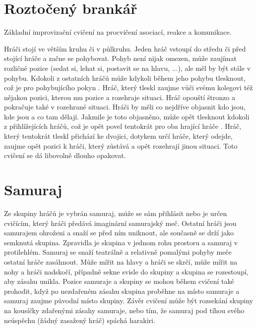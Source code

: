 \documentclass[main.tex]{subfiles}
\begin{document}
 
 
 
\needspace{5cm} \section{Roztočený brankář} \label{roztočený brankář} Základní improvizační cvičení na procvičení asociací, reakce a komunikace. 
 
Hráči stojí ve větším kruhu či v půlkruhu. Jeden hráč vstoupí do středu či před stojící hráče a začne se pohybovat. Pohyb není nijak omezen, může zaujímat rozličné pozice (sedat si, lehat si, postavit se na hlavu, ...), ale měl by být stále v pohybu. Kdokoli z ostatních hráčů může kdykoli během jeho pohybu tlesknout, což je pro pohybujícího pokyn . Hráč, který tleskl zaujme vůči svému kolegovi též nějakou pozici, kterou mu pozice  a rozehraje situaci. Hráč opouští štronzo a pokračuje také v rozehrané situaci. Hráči by měli co nejdříve objasnit kdo jsou, kde jsou a co tam dělají. Jakmile je toto objasněno, může opět tlesknout kdokoli z přihlížejících hráčů, což je opět povel tentokrát pro oba hrající hráče . Hráč, který tentokrát tleskl přichází ke dvojici, dotykem určí hráče, který odejde, zaujme opět pozici k hráči, který zůstává a opět rozehrají jinou situaci. Toto cvičení se dá libovolně dlouho opakovat. 
 
 
 
 
\needspace{5cm} \section{Samuraj} \label{samuraj} Ze skupiny hráčů je vybrán samuraj, může se sám přihlásit nebo je určen cvičícím, který hráči předává imaginární samurajský meč. Ostatní hráči jsou samurajem ohroženi a snaží se před ním uniknout, ale současně se drží jako semknutá skupina. Zpravidla je skupina v jednom rohu prostoru a samuraj v protilehlém. Samuraj se snaží teatrálně a relativně pomalými pohyby meče ostatní hráče zasáhnout. Může mířit na hlavy a hráči se skrčí, může mířit na nohy a hráči nadskočí, případně sekne svisle do skupiny a skupina se rozestoupí, aby zásahu unikla. Pozice samuraje a skupiny se mohou během cvičení také prohodit, když po nezdařeném zásahu skupina proběhne na místo samuraje a samuraj zaujme původní místo skupiny. Závěr cvičení může být rozsekání skupiny na kousíčky zdařenými zásahy samuraje, nebo tím, že samuraj pod tíhou svého neúspěchu (žádný zasažený hráč) spáchá harakiri. 
 
\end{document}
